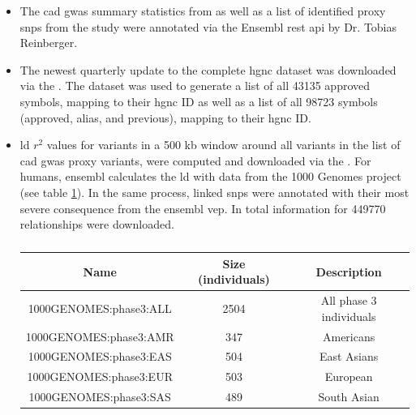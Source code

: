 \begin{itemize}
    \item {} The \ac{cad} \ac{gwas} summary statistics from \textcite{aragamDiscoverySystematicCharacterization2021} as well as a list of identified proxy \acp{snp} from the study were annotated via the Ensembl \ac{rest} \ac{api} by Dr. Tobias Reinberger.

    \item {} The newest quarterly update to the complete \ac{hgnc} dataset was downloaded via the . The dataset was used to generate a list of all 43135 approved symbols, mapping to their \ac{hgnc} ID as well as a list of all 98723 symbols (approved, alias, and previous), mapping to their \ac{hgnc} ID.

    \item {} \ac{ld} $r^2$ values for variants in a 500 kb window around all variants in the list of \ac{cad} \ac{gwas} proxy variants, were computed and downloaded via the . For humans, ensembl calculates the \ac{ld} with data from the 1000 Genomes project (see table \ref{tab:populations}). In the same process, linked \acp{snp} were annotated with their most severe consequence from the ensembl \ac{vep}. In total information for 449770 relationships were downloaded.

    \begin{table}[h]
    \capstart
    \centering
    \begin{minipage}{\captionwidth}
        \caption[1000 Genomes Populations]{}
        \label{tab:populations}
    \end{minipage}
    \begin{tabular}{|c|c|c|}
        \hline
        Name                   & Size (individuals)   & Description      \\ \hline
        1000GENOMES:phase3:ALL & 2504                 & All phase 3 individuals  \\
        1000GENOMES:phase3:AMR & 347                  & Americans  \\
        1000GENOMES:phase3:EAS & 504                  & East Asians  \\
        1000GENOMES:phase3:EUR & 503                  & European \\
        1000GENOMES:phase3:SAS & 489                  & South Asian  \\ \hline
    \end{tabular}
    \end{table}


\end{itemize}

